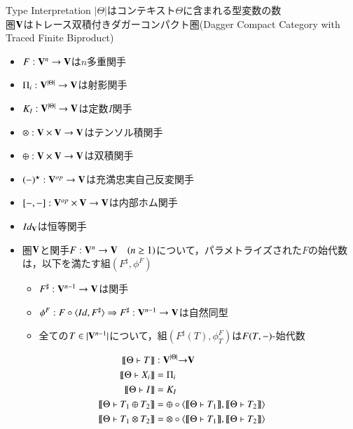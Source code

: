 \documentclass[10pt]{jsarticle}
\newcommand{\semantics}[1]{{\llbracket #1 \rrbracket}}
\begin{document}
\begin{itembox}[c]{Type Interpretation}
$|\Theta|$はコンテキスト$\Theta$に含まれる型変数の数 \\
圏$\bf{V}$はトレース双積付きダガーコンパクト圏(Dagger Compact Category with Traced Finite Biproduct)
\begin{itemize}
  \item $F: {\bf V}^n \rightarrow {\bf V}$は$n$多重関手
  \item $\Pi_i:{\bf V}^{|\Theta|} \rightarrow {\bf V}$は射影関手
  \item $K_I:{\bf V}^{|\Theta|} \rightarrow {\bf V}$は定数$I$関手
  \item $\otimes:{\bf V} \times {\bf V} \rightarrow {\bf V}$はテンソル積関手
  \item $\oplus:{\bf V} \times {\bf V} \rightarrow {\bf V}$は双積関手
  \item $(-)^\star:{\bf V}^{op} \rightarrow {\bf V}$は充満忠実自己反変関手
  \item $[-,-]:{\bf V}^{op} \times {\bf V} \rightarrow {\bf V}$は内部ホム関手
  \item $Id_{\bf V}$は恒等関手
  \item 圏$\bf{V}$と関手$F:{\bf V}^n \rightarrow {\bf V}\quad(n \ge 1)$について，パラメトライズされた$F$の始代数は，以下を満たす組$(F^\sharp, \phi^F)$
    \begin{itemize}
      \item $F^\sharp:{\bf V}^{n-1} \rightarrow {\bf V}$は関手
      \item $\phi^F:F\circ\langle{Id,F^\sharp}\rangle \Rightarrow F^\sharp:{\bf V}^{n-1} \rightarrow {\bf V}$は自然同型
      \item 全ての$T\in|{\bf V}^{n-1}|$について，組$(F^\sharp(T),\phi^F_T)$は$F(T,-)\mathchar`-$始代数
    \end{itemize}
\end{itemize}
  \begin{align*}
    \semantics{\Theta \vdash T}                  &: {\bf V}^{|\Theta|} {\bf\rightarrow} {\bf V} \\
    \semantics{\Theta \vdash X_i}                &= \Pi_i \\
    \semantics{\Theta \vdash I}                  &= K_I \\
    \semantics{\Theta \vdash T_1\oplus{}T_2}     &= \oplus\circ\langle\semantics{\Theta \vdash T_1},\semantics{\Theta \vdash T_2}\rangle \\
    \semantics{\Theta \vdash T_1\otimes{}T_2}    &= \otimes\circ\langle\semantics{\Theta \vdash T_1},\semantics{\Theta \vdash T_2}\rangle \\

\end{align*}
\end{itembox}
\end{document}
